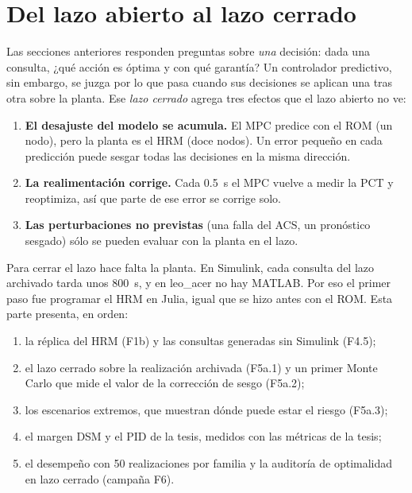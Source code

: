 \section{Del lazo abierto al lazo cerrado}\label{sec:cl-intro}
\noindent Las secciones anteriores responden preguntas sobre \emph{una} decisión: dada una
consulta, ¿qué acción es óptima y con qué garantía? Un controlador predictivo, sin embargo, se
juzga por lo que pasa cuando sus decisiones se aplican una tras otra sobre la planta. Ese
\emph{lazo cerrado} agrega tres efectos que el lazo abierto no ve:
\begin{enumerate}
  \item \textbf{El desajuste del modelo se acumula.} El MPC predice con el ROM (un nodo),
        pero la planta es el HRM (doce nodos). Un error pequeño en cada predicción puede
        sesgar todas las decisiones en la misma dirección.
  \item \textbf{La realimentación corrige.} Cada 0.5~s el MPC vuelve a medir la PCT y
        reoptimiza, así que parte de ese error se corrige solo.
  \item \textbf{Las perturbaciones no previstas} (una falla del ACS, un pronóstico sesgado)
        sólo se pueden evaluar con la planta en el lazo.
\end{enumerate}
\noindent Para cerrar el lazo hace falta la planta. En Simulink, cada consulta del lazo
archivado tarda unos 800~s, y en leo\_acer no hay MATLAB. Por eso el primer paso fue
programar el HRM en Julia, igual que se hizo antes con el ROM. Esta parte presenta, en orden:
\begin{enumerate}
  \item la réplica del HRM (F1b) y las consultas generadas sin Simulink (F4.5);
  \item el lazo cerrado sobre la realización archivada (F5a.1) y un primer Monte Carlo que mide
        el valor de la corrección de sesgo (F5a.2);
  \item los escenarios extremos, que muestran dónde puede estar el riesgo (F5a.3);
  \item el margen DSM y el PID de la tesis, medidos con las métricas de la tesis;
  \item el desempeño con 50 realizaciones por familia y la auditoría de optimalidad en lazo
        cerrado (campaña F6).
\end{enumerate}

